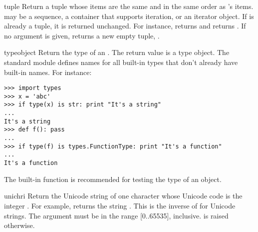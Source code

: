 \begin{funcdesc}{tuple}{}
  Return a tuple whose items are the same and in the same order as
  's items.   may be a sequence, a
  container that supports iteration, or an iterator object.
  If  is already a tuple, it
  is returned unchanged.  For instance,  returns
   and  returns
  .  If no argument is given, returns a new empty
  tuple, \code{()}.
\end{funcdesc}

\begin{funcdesc}{type}{object}
  Return the type of an .  The return value is a
  type object.  The standard module
   defines names for all built-in
  types that don't already have built-in names.
  For instance:

\begin{verbatim}
>>> import types
>>> x = 'abc'
>>> if type(x) is str: print "It's a string"
...
It's a string
>>> def f(): pass
...
>>> if type(f) is types.FunctionType: print "It's a function"
...
It's a function
\end{verbatim}

  The  built-in function is recommended for
  testing the type of an object.
\end{funcdesc}

\begin{funcdesc}{unichr}{i}
  Return the Unicode string of one character whose Unicode code is the
  integer .  For example,  returns the string
  .  This is the inverse of  for Unicode
  strings.  The argument must be in the range [0..65535], inclusive.
   is raised otherwise.
\end{funcdesc}

